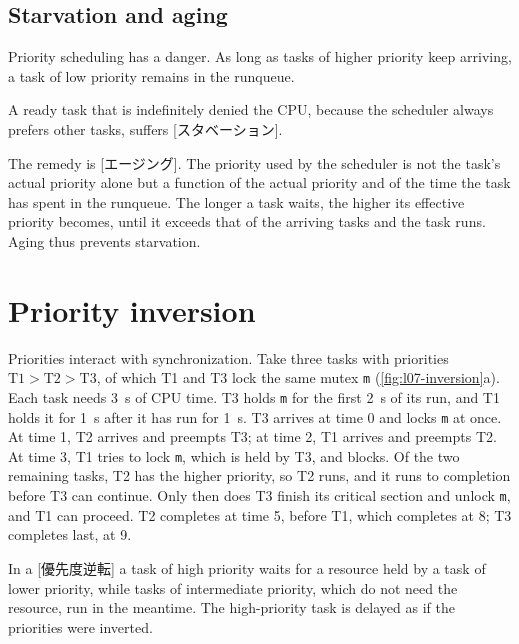 \documentclass[../main.tex]{subfiles}
\begin{document}
\subsection{Starvation and aging}

Priority scheduling has a danger.  As long as tasks of higher priority keep
arriving, a task of low priority remains in the runqueue.

\begin{definition}[Starvation]
  A ready task that is indefinitely denied the CPU, because the scheduler
  always prefers other tasks, suffers [スタベーション].
\end{definition}

The remedy is [エージング].  The priority used by the
scheduler is not the task's actual priority alone but a function of the
actual priority and of the time the task has spent in the runqueue.  The
longer a task waits, the higher its effective priority becomes, until it
exceeds that of the arriving tasks and the task runs.  Aging thus prevents
starvation.

\section{Priority inversion}
\label{sec:l07-inversion}

Priorities interact with synchronization.  Take three tasks with priorities
$\text{T1} > \text{T2} > \text{T3}$, of which T1 and T3 lock the same mutex
\texttt{m} (\cref{fig:l07-inversion}a).  Each task needs \SI{3}{\second} of
CPU time.  T3 holds \texttt{m} for the first \SI{2}{\second} of its run, and
T1 holds it for \SI{1}{\second} after it has run for \SI{1}{\second}.  T3
arrives at time 0 and locks \texttt{m} at once.  At time 1, T2 arrives and
preempts T3; at time 2, T1 arrives and preempts T2.  At time 3, T1 tries to
lock \texttt{m}, which is held by T3, and blocks.  Of the two remaining tasks, T2 has the higher
priority, so T2 runs, and it runs to completion before T3 can continue.
Only then does T3 finish its critical section and unlock \texttt{m}, and T1
can proceed.  T2 completes at time 5, before T1, which completes at 8;
T3 completes last, at 9.

\begin{definition}
  In a [優先度逆転] a task of high priority waits
  for a resource held by a task of lower priority, while tasks of
  intermediate priority, which do not need the resource, run in the
  meantime.  The high-priority task is delayed as if the priorities were
  inverted.
\end{definition}
\end{document}
